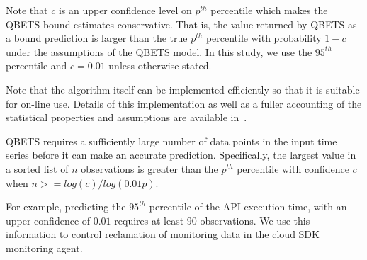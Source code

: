 
Note that $c$ is an upper confidence level on $p^{th}$ percentile
which makes the QBETS
bound estimates conservative.  That is, the value returned by QBETS as a bound
prediction is larger than the true $p^{th}$ percentile with probability $1-c$
under the assumptions of the QBETS model. 
In this study, we use the $95^{th}$ percentile and $c = 0.01$ unless
otherwise stated. 

Note that the algorithm itself can be implemented efficiently so that it is
suitable for on-line use.  Details of this implementation as well as a fuller
accounting of the statistical properties and assumptions are available
in~\cite{Nurmi:2007:QQB:1791551.1791556,uptime-bootstrap,quant-est,ckpt-sched}.



QBETS requires a sufficiently large number of data points
in the input time series before it can make an accurate prediction. 
Specifically, the largest value in a sorted list of $n$ observations is
greater than the $p^{th}$ percentile with confidence $c$ when $n >=
log(c)/log(0.01p)$.

For example, predicting the $95^{th}$ percentile
of the API execution time, with an upper confidence of $0.01$ requires at
least $90$ observations.
We use this information to control 
reclamation of monitoring data in the cloud SDK monitoring agent.

